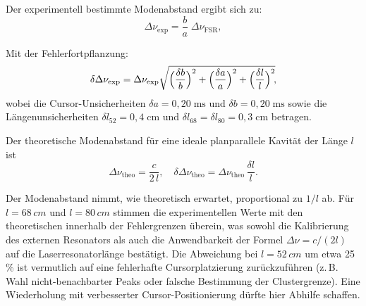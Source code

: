 Der experimentell bestimmte Modenabstand ergibt sich zu:
\begin{equation}
 \Delta\nu_{\mathrm{exp}}
  = \frac{b}{a}\;\Delta\nu_{\mathrm{FSR}},
\end{equation}

Mit der Fehlerfortpflanzung:
\begin{equation}
  \delta\Delta\nu_{\mathrm{exp}}
  =\Delta\nu_{\mathrm{exp}}
    \sqrt{\Bigl(\frac{\delta b}{b}\Bigr)^{2}
        + \Bigl(\frac{\delta a}{a}\Bigr)^{2}
        + \Bigl(\frac{\delta l}{l}\Bigr)^{2}}\!,
\end{equation}
wobei die Cursor-Unsicherheiten $\delta a = 0{,}20\;\mathrm{ms}$ und $\delta b = 0{,}20\;\mathrm{ms}$ sowie die Längenunsicherheiten $\delta l_{52} = 0{,}4\;\mathrm{cm}$ und $\delta l_{68} = \delta l_{80} = 0{,}3\;\mathrm{cm}$ betragen.

Der theoretische Modenabstand für eine ideale planparallele Kavität der Länge $l$ ist
\begin{equation}
 \Delta\nu_{\mathrm{theo}}
  = \frac{c}{2\,l},
  \quad
  \delta\Delta\nu_{\mathrm{theo}}
  =\Delta\nu_{\mathrm{theo}}\,\frac{\delta l}{l}.
\end{equation}

\begin{table}[H]
  \centering
  \caption{Experimentelle und theoretische Modenabstände für verschiedene interne Kavitätenlängen.}
  \label{tab:mode-spacings}
\end{table}

Der Modenabstand nimmt, wie theoretisch erwartet, proportional zu \(1/l\) ab. 
Für \(l = 68\,\si{cm}\) und \(l = 80\,\si{cm}\) stimmen die experimentellen Werte mit den theoretischen innerhalb der Fehlergrenzen überein, was sowohl die Kalibrierung des externen Resonators als auch die Anwendbarkeit der Formel \(\Delta\nu = c/(2l)\) auf die Laserresonatorlänge bestätigt. 
Die Abweichung bei \(l = 52\,\si{cm}\) um etwa 25\,\% ist vermutlich auf eine fehlerhafte Cursorplatzierung zurückzuführen (z.\,B. Wahl nicht-benachbarter Peaks oder falsche Bestimmung der Clustergrenze). 
Eine Wiederholung mit verbesserter Cursor-Positionierung dürfte hier Abhilfe schaffen.

